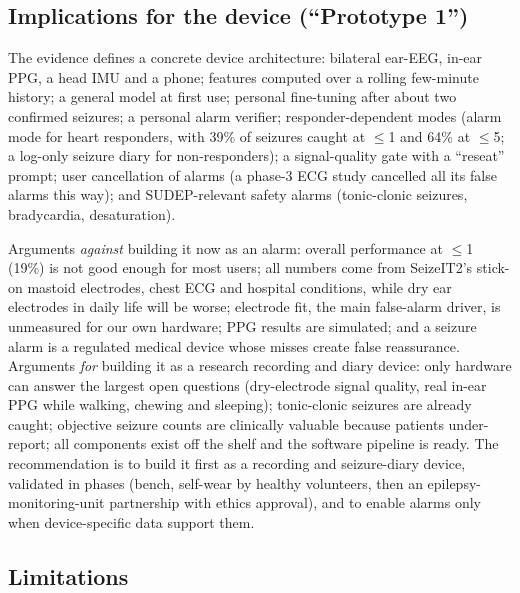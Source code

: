 \subsection{Implications for the device (``Prototype 1'')}

The evidence defines a concrete device architecture: bilateral ear-EEG, in-ear PPG, a head IMU and a phone; features computed over a rolling few-minute history; a general model at first use; personal fine-tuning after about two confirmed seizures; a personal alarm verifier; responder-dependent modes (alarm mode for heart responders, with 39\% of seizures caught at $\le$1 \FAd{} and 64\% at $\le$5; a log-only seizure diary for non-responders); a signal-quality gate with a ``reseat'' prompt; user cancellation of alarms (a phase-3 ECG study cancelled all its false alarms this way); and SUDEP-relevant safety alarms (tonic-clonic seizures, bradycardia, desaturation).

Arguments \emph{against} building it now as an alarm: overall performance at $\le$1 \FAd{} (19\%) is not good enough for most users; all numbers come from SeizeIT2's stick-on mastoid electrodes, chest ECG and hospital conditions, while dry ear electrodes in daily life will be worse; electrode fit, the main false-alarm driver, is unmeasured for our own hardware; PPG results are simulated; and a seizure alarm is a regulated medical device whose misses create false reassurance. Arguments \emph{for} building it as a research recording and diary device: only hardware can answer the largest open questions (dry-electrode signal quality, real in-ear PPG while walking, chewing and sleeping); tonic-clonic seizures are already caught; objective seizure counts are clinically valuable because patients under-report; all components exist off the shelf and the software pipeline is ready. The recommendation is to build it first as a recording and seizure-diary device, validated in phases (bench, self-wear by healthy volunteers, then an epilepsy-monitoring-unit partnership with ethics approval), and to enable alarms only when device-specific data support them.

\subsection{Limitations}

